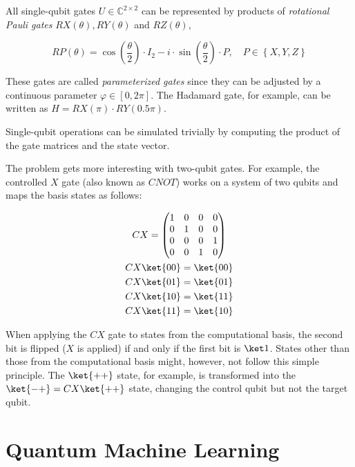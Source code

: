 All single-qubit gates $U \in \mathbb{C}^{2 \times 2}$ can be represented by
products of \emph{rotational Pauli gates} $RX(\theta), RY(\theta)$ and
$RZ(\theta)$,

\begin{equation}
    \label{eq:rotational-pauli-gates}
    RP\left(\theta\right) = \cos\left(\frac\theta2\right) \cdot I_2 - i \cdot \sin\left(\frac\theta2\right) \cdot P,\quad
    P \in \left\{X, Y, Z\right\}
\end{equation}

These gates are called \emph{parameterized gates} since they can be adjusted by a
continuous parameter $\varphi \in \left[0, 2\pi\right]$.
The Hadamard gate, for example, can be written as
$H = RX(\pi) \cdot RY(0.5\pi)$.

Single-qubit operations can be simulated trivially by computing the product of
the gate matrices and the state vector.

The problem gets more interesting with two-qubit gates.
For example, the controlled $X$ gate (also known as $CNOT$) works on a system
of two qubits and maps the basis states as follows:

\begin{gather}
    \label{eq:cx-zbasis}
    CX = \begin{pmatrix}
        1&0&0&0\\
        0&1&0&0\\
        0&0&0&1\\
        0&0&1&0
    \end{pmatrix}\\
    CX \ket{00} = \ket{00}\\
    CX \ket{01} = \ket{01}\\
    CX \ket{10} = \ket{11}\\
    CX \ket{11} = \ket{10}
\end{gather}

When applying the $CX$ gate to states from the computational basis, the second
bit is flipped ($X$ is applied) if and only if the first bit is $\ket 1$.
States other than those from the computational basis might, however, not follow
this simple principle.
The $\ket{++}$ state, for example, is transformed into the
$\ket{-+} = CX \ket{++}$ state, changing the control qubit but not the target
qubit.


\section{Quantum Machine Learning}
\label{sec:qml-intro}

